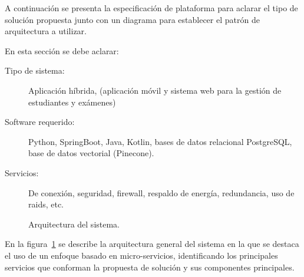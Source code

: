 A continuación se presenta la especificación de plataforma para aclarar el tipo de solución propuesta junto con un diagrama para establecer el patrón de arquitectura a utilizar.
	
 En esta sección se debe aclarar:
	
\begin{description}
	\item[Tipo de sistema:] Aplicación híbrida, (aplicación móvil y sistema web para la gestión de estudiantes y exámenes)
	\item[Software requerido:] Python, SpringBoot, Java, Kotlin, bases de datos relacional PostgreSQL, base de datos vectorial (Pinecone).
	\item[Servicios:] De conexión, seguridad, firewall, respaldo de energía, redundancia, uso de raids, etc.
\end{description}


\begin{figure}[htbp!]
	\begin{center}
		\caption{Arquitectura del sistema.}
		\label{fig:arquitectura}
	\end{center}
\end{figure}

En la figura~\ref{fig:arquitectura} se describe la arquitectura general del sistema en la que se destaca el uso de un enfoque basado en micro-servicios, identificando los principales servicios que conforman la propuesta de solución y sus componentes principales.
